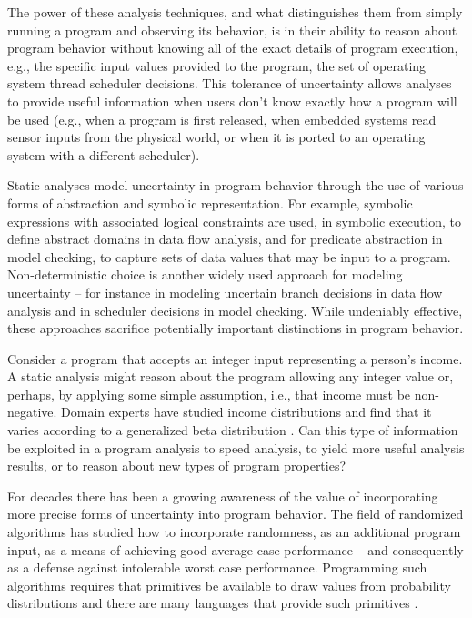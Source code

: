 The power of these analysis techniques, and what distinguishes them from
simply running a program and observing its behavior, is in their
ability to reason about program behavior without knowing all of the
exact details of program execution, e.g., the specific 
input values provided to the program, the set of operating system
thread scheduler decisions.  This tolerance of uncertainty allows analyses
to provide useful information when users don't know exactly how
a program will be used (e.g., when a program is first released, when
embedded systems read sensor inputs from the physical world, or
when it is ported to an operating system with a different scheduler).

Static analyses model uncertainty in program behavior
through the use of various forms of abstraction and symbolic representation.
For example, symbolic expressions with associated logical constraints 
are used, in symbolic execution, to define abstract domains
in data flow analysis, and for predicate abstraction in model checking, 
to capture sets of data values that may be input to a program.
Non-deterministic choice is another widely used approach for modeling
uncertainty -- for instance in modeling uncertain branch 
decisions in data flow analysis and
in scheduler decisions in model checking.
While undeniably effective, these approaches sacrifice potentially
important distinctions in program behavior.   

Consider a program that accepts an integer input representing
a person's income.  A static analysis might reason about the program
allowing any integer value or, perhaps, by applying
some simple assumption, i.e., that income must be non-negative.
Domain experts have studied income distributions and find that
it varies according to a generalized beta distribution 
\cite{IncomeDistribution}.  Can this type of information be 
exploited in a program analysis to speed analysis,
to yield more useful analysis results, or to reason 
about new types of program properties?

For decades there has been a growing awareness of the value of 
incorporating more precise forms of uncertainty into program behavior.  
The field of randomized algorithms has studied how to incorporate
randomness, as an additional program input, as a means of achieving
good average case performance -- and consequently as a defense against
intolerable worst case performance.
Programming such algorithms requires that primitives be available
to draw values from probability distributions and there are many
languages that provide such primitives \cite{NetLogo,others}.  

